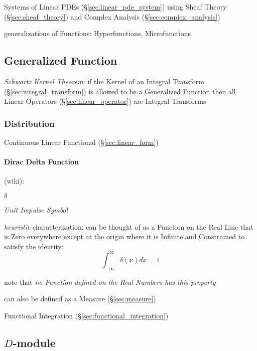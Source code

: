 Systems of Linear PDEs (\S\ref{sec:linear_pde_system}) using Sheaf Theory
(\S\ref{sec:sheaf_theory}) and Complex Analysis (\S\ref{sec:complex_analysis})

generalizations of Functions: Hyperfunctions, Microfunctions



\subsection{Generalized Function}\label{sec:generalized_function}

\emph{Schwartz Kernel Theorem}: if the Kernel of an Integral Transform
(\S\ref{sec:integral_transform}) is allowed to be a Generalized Function then
all Linear Operators (\S\ref{sec:linear_operator}) are Integral Transforms



\subsubsection{Distribution}\label{sec:distribution}

Continuous Linear Functional (\S\ref{sec:linear_form})



\paragraph{Dirac Delta Function}\label{sec:dirac_delta}\hfill

(wiki):

$\delta$

\emph{Unit Impulse Symbol}

\emph{heuristic} characterization: can be thought of as a Function on the Real
Line that is Zero everywhere except at the origin where it is Infinite and
Constrained to satisfy the identity:
\[
  \int_{-\infty}^\infty \delta(x) dx = 1
\]

note that \emph{no Function defined on the Real Numbers has this property}

can also be defined as a Measure (\S\ref{sec:measure})

\fist Functional Integration (\S\ref{sec:functional_integration})



\subsection{$D$-module}\label{sec:d_module}

